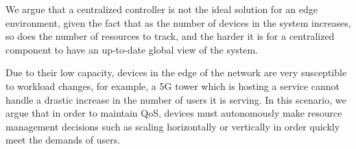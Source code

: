 We argue that a centralized controller is not the ideal solution for an edge environment, given the fact that as the number of devices in the system increases, so does the number of resources to track, and the harder it is for a centralized component to have an up-to-date global view of the system. 

Due to their low capacity, devices in the edge of the network are very susceptible to workload changes, for example, a 5G tower which is hosting a service cannot handle a drastic increase in the number of users it is serving. In this scenario, we argue that in order to maintain QoS, devices must autonomously make resource management decisions such as scaling horizontally or vertically in order quickly meet the demands of users.








